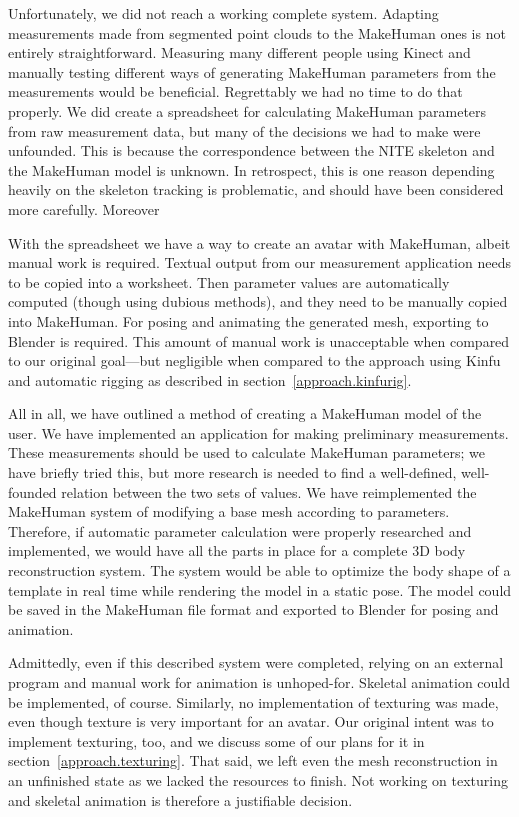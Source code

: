 Unfortunately, we did not reach a working complete system. Adapting measurements made from segmented point clouds to the MakeHuman ones is not entirely straightforward. Measuring many different people using Kinect and manually testing different ways of generating MakeHuman parameters from the measurements would be beneficial. Regrettably we had no time to do that properly. We did create a spreadsheet for calculating MakeHuman parameters from raw measurement data, but many of the decisions we had to make were unfounded. This is because the correspondence between the NITE skeleton and the MakeHuman model is unknown. In retrospect, this is one reason depending heavily on the skeleton tracking is problematic, and should have been considered more carefully. Moreover

With the spreadsheet we have a way to create an avatar with MakeHuman, albeit manual work is required. Textual output from our measurement application needs to be copied into a worksheet. Then parameter values are automatically computed (though using dubious methods), and they need to be manually copied into MakeHuman. For posing and animating the generated mesh, exporting to Blender is required. This amount of manual work is unacceptable when compared to our original goal---but negligible when compared to the approach using Kinfu and automatic rigging as described in section~\ref{approach.kinfurig}.

All in all, we have outlined a method of creating a MakeHuman model of the user. We have implemented an application for making preliminary measurements. These measurements should be used to calculate MakeHuman parameters; we have briefly tried this, but more research is needed to find a well-defined, well-founded relation between the two sets of values. We have reimplemented the MakeHuman system of modifying a base mesh according to parameters. Therefore, if automatic parameter calculation were properly researched and implemented, we would have all the parts in place for a complete 3D body reconstruction system. The system would be able to optimize the body shape of a template in real time while rendering the model in a static pose. The model could be saved in the MakeHuman file format and exported to Blender for posing and animation.

Admittedly, even if this described system were completed, relying on an external program and manual work for animation is unhoped-for. Skeletal animation could be implemented, of course. Similarly, no implementation of texturing was made, even though texture is very important for an avatar. Our original intent was to implement texturing, too, and we discuss some of our plans for it in section~\ref{approach.texturing}. That said, we left even the mesh reconstruction in an unfinished state as we lacked the resources to finish. Not working on texturing and skeletal animation is therefore a justifiable decision.

